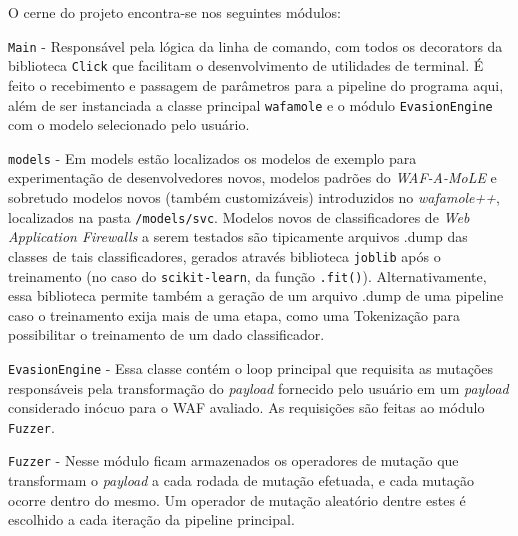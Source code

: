 O cerne do projeto encontra-se nos seguintes módulos:
\begin{alineas}
\item \verb+Main+ - Responsável pela lógica da linha de comando, com todos os decorators da biblioteca \verb+Click+ que facilitam o desenvolvimento de utilidades de terminal. É feito o recebimento e passagem de parâmetros para a pipeline do programa aqui, além de ser instanciada a classe principal \verb+wafamole+ e o módulo \verb+EvasionEngine+ com o modelo selecionado pelo usuário.
\item \verb+models+ - Em models estão localizados os modelos de exemplo para experimentação de desenvolvedores novos, modelos padrões do \textit{WAF-A-MoLE} e sobretudo modelos novos (também customizáveis) introduzidos no \textit{wafamole++}, localizados na pasta \verb+/models/svc+. Modelos novos de classificadores de \textit{Web Application Firewalls} a serem testados são tipicamente arquivos .dump das classes de tais classificadores, gerados através biblioteca \verb+joblib+ após o treinamento (no caso do \verb+scikit-learn+, da função \verb+.fit()+). Alternativamente, essa biblioteca permite também a geração de um arquivo .dump de uma pipeline caso o treinamento exija mais de uma etapa, como uma Tokenização para possibilitar o treinamento de um dado classificador.
\item \verb+EvasionEngine+ - Essa classe contém o loop principal que requisita as mutações responsáveis pela transformação do \textit{payload} fornecido pelo usuário em um \textit{payload} considerado inócuo para o WAF avaliado. As requisições são feitas ao módulo \verb+Fuzzer+.
\item \verb+Fuzzer+ - Nesse módulo ficam armazenados os operadores de mutação que transformam o \textit{payload} a cada rodada de mutação efetuada, e cada mutação ocorre dentro do mesmo. Um operador de mutação aleatório dentre estes é escolhido a cada iteração da pipeline principal.
\end{alineas}

